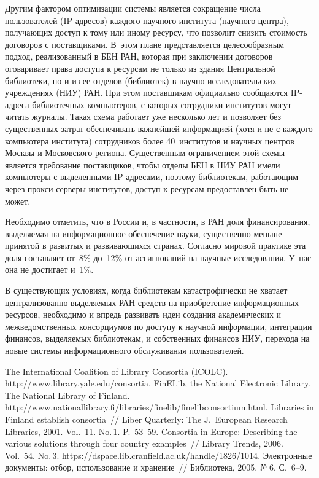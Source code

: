 \begin{multicols}{2}
     Другим фактором оптимизации системы является сокращение числа 
пользователей (IP-ад\-ре\-сов) каждого научного института (научного 
центра), получающих доступ к тому или иному ресурсу, что позволит 
снизить стоимость договоров с поставщиками. В~этом плане представляется 
целесообразным подход, реализованный в БЕН РАН, которая при 
заключении договоров оговаривает права доступа к ресурсам не только из 
здания Центральной биб\-лио\-те\-ки, но и из ее отделов (биб\-лио\-тек) в 
на\-уч\-но-ис\-сле\-до\-ва\-тель\-ских учреждениях (НИУ) РАН. 
При этом поставщикам официально сообщаются IP-ад\-ре\-са биб\-лио\-теч\-ных 
компьютеров, с которых сотрудники институтов могут читать журналы. 
Такая схема работает уже несколько лет и позволяет без существенных 
затрат обеспечивать важнейшей информацией (хотя и не с каждого 
компьютера института) сотрудников более 40~институтов и научных центров 
Москвы и Московского региона. Существенным ограничением этой схемы 
является требование поставщиков, чтобы отделы БЕН в НИУ РАН имели 
компьютеры с выделенными IP-ад\-ре\-са\-ми, поэтому биб\-лио\-те\-кам, 
работающим через про\-кси-сер\-ве\-ры институтов, доступ к ресурсам 
предоставлен быть не может.
     
     Необходимо отметить, что в России и, в част\-ности, в РАН доля 
финансирования, выделяемая на информационное обеспечение науки, 
существенно меньше принятой в развитых и развивающихся странах. 
Согласно мировой практике эта доля составляет от~8\% до~12\% от 
ассигнований на научные исследования. У~нас она не достигает и~1\%.
     
     В существующих условиях, когда биб\-лио\-те\-кам катастрофически не 
хватает централизованно выделяемых РАН средств на приобретение 
информационных ресурсов, необходимо и впредь развивать идеи создания 
академических и межведомственных консорциумов по доступу к научной 
информации, интеграции финансов, выделяемых биб\-лио\-те\-кам, и 
собственных финансов НИУ, перехода на новые системы информационного 
обслуживания пользователей.


{\small\frenchspacing
{%
\begin{thebibliography}{9}
     
     
The International Coalition of Library Consortia (ICOLC). {\sf 
http://www.library.yale.edu/consortia}.
FinELib, the National Electronic Library. The National Library of Finland. {\sf 
http://www.nationallibrary.fi/\linebreak libraries/finelib/finelibconsortium.html}.
 Libraries in Finland establish consortia~// Liber 
Quarterly: The J.~European Research Libraries, 2001. Vol.~11. No.\,1. P.~53--59.
 Consortia in Europe: Describing the various 
solutions through four country examples~// Library Trends, 2006. Vol.~54. No.\,3. 
{\sf https://dspace.lib.cranfield.ac.uk/handle/1826/1014}.
 Электронные документы: отбор, использование и 
хранение~// Библиотека, 2005. №\,6. С.~6--9.



\end{thebibliography}}}
\end{multicols}
